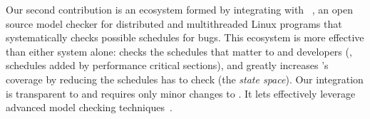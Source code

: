 
Our second contribution is an ecosystem formed by integrating \parrot with
\dbug~\cite{dbug:spin11}, an open source model checker for 
distributed and multithreaded Linux programs that systematically checks possible schedules for bugs.
This \ecosys ecosystem is more effective than
either system alone: \dbug checks the schedules
that matter to \parrot and developers (\eg, schedules added by performance
critical sections), and \parrot greatly increases \dbug's coverage by
reducing the schedules \dbug has to check (the \emph{state space}). Our
integration is transparent to \dbug and requires only minor
changes to \parrot.  It lets \parrot effectively leverage advanced model
checking techniques~\cite{flanagan:dynamicpo, demeter:sosp11}.



